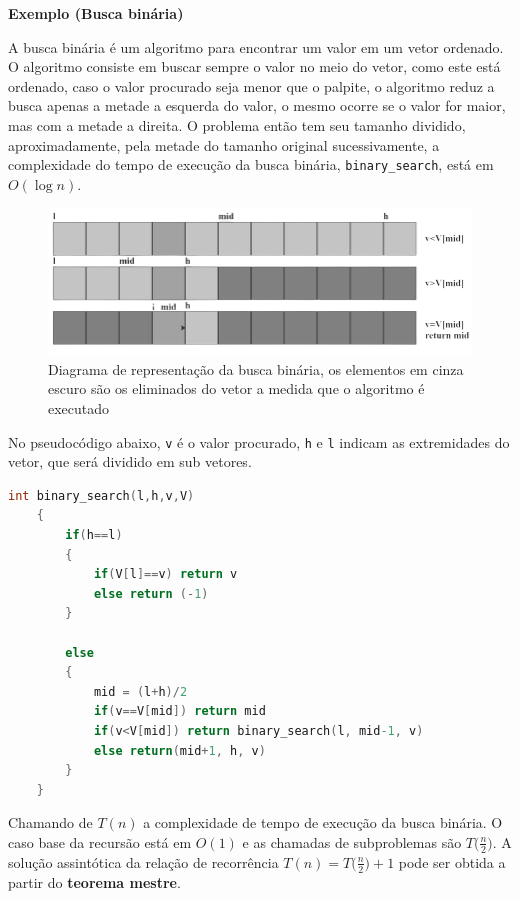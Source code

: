 \textbf{Exemplo (Busca binária)}

A busca binária é um algoritmo para encontrar um valor em um vetor ordenado. O algoritmo consiste em buscar sempre o valor no meio do vetor, como este está ordenado, caso o valor procurado seja menor que o palpite, o algoritmo reduz a busca apenas a metade a esquerda do valor, o mesmo ocorre se o valor for maior, mas com a metade a direita. O problema então tem seu tamanho dividido, aproximadamente, pela metade do tamanho original sucessivamente, a complexidade do tempo de execução da busca binária, \texttt{binary\_search}, está em $O(\log n)$.

\begin{figure}
  \centering
  \includegraphics[width=1\linewidth]{img/binary_search.png}
    \caption{Diagrama de representação da busca binária, os elementos em cinza escuro são os eliminados do vetor a medida que o algoritmo é executado}
    \label{binary_search}
\end{figure}

No pseudocódigo abaixo, \texttt{v} é o valor procurado, \texttt{h} e \texttt{l} indicam as extremidades do vetor, que será dividido em sub vetores.

\begin{lstlisting}[language=C, frame=single]
    int binary_search(l,h,v,V)
    {
        if(h==l)
        {
            if(V[l]==v) return v
            else return (-1)
        }
        
        else
        {
            mid = (l+h)/2
            if(v==V[mid]) return mid
            if(v<V[mid]) return binary_search(l, mid-1, v)
            else return(mid+1, h, v)
        }
    }
\end{lstlisting}

Chamando de $T(n)$ a complexidade de tempo de execução da busca binária. O caso base da recursão está em $O(1)$ e as chamadas de subproblemas são $T\Bigr(\frac{n}{2}\Bigr)$. A solução assintótica da relação de recorrência $T(n)=T\Bigr(\frac{n}{2}\Bigr)+1$ pode ser obtida a partir do \textbf{teorema mestre}.

